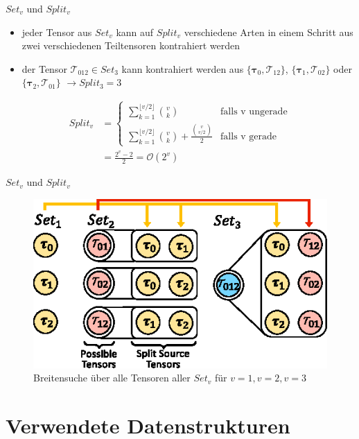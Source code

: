\documentclass{beamer}
\newcommand{\Tau}{\bm{\mathcal{T}}}
\newcommand{\tauB}{\bm{\tau}}
\begin{document}
\begin{frame}{$Set_v$ und $Split_v$}
	\begin{itemize}
		\item jeder Tensor aus $Set_v$ kann auf $Split_v$ verschiedene Arten in einem Schritt aus zwei verschiedenen Teiltensoren kontrahiert werden
		\item der Tensor $\Tau_{012} \in Set_3$ kann kontrahiert werden aus $\{\tauB_0, \Tau_{12} \}$, $\{\tauB_{1}, \Tau_{02} \}$ oder $\{\tauB_{2}, \Tau_{01} \}$ $\rightarrow Split_3 = 3$
	\end{itemize}
	\begin{align*}
		Split_v & = \begin{cases}
			            \sum^{\lfloor v/2 \rfloor}_{k=1} \binom{v}{k}                            & \text{falls v ungerade} \\
			            \sum^{\lfloor v/2 \rfloor}_{k=1} \binom{v}{k} + \frac{\binom{v}{v/2}}{2} & \text{falls v gerade}
		            \end{cases} \\
		        & = \frac{2^v - 2}{2} = \mathcal{O}(2^v)
	\end{align*}
\end{frame}

\begin{frame}{$Set_v$ und $Split_v$}
	\begin{figure}
		\includegraphics{figure_04}
		\caption*{Breitensuche über alle Tensoren aller $Set_v$ für $v=1, v=2, v=3$}
	\end{figure}
\end{frame}


\section{Verwendete Datenstrukturen}
\end{document}
